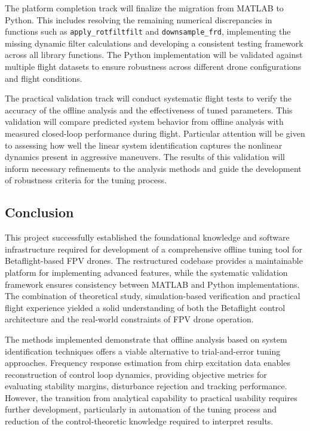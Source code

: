 \documentclass[a4paper,11pt]{scrartcl}
\begin{document}
The platform completion track will finalize the migration from MATLAB to Python. This includes resolving the remaining numerical discrepancies in functions such as \texttt{apply\_rotfiltfilt} and \texttt{downsample\_frd}, implementing the missing dynamic filter calculations and developing a consistent testing framework across all library functions. The Python implementation will be validated against multiple flight datasets to ensure robustness across different drone configurations and flight conditions.

The practical validation track will conduct systematic flight tests to verify the accuracy of the offline analysis and the effectiveness of tuned parameters. This validation will compare predicted system behavior from offline analysis with measured closed-loop performance during flight. Particular attention will be given to assessing how well the linear system identification captures the nonlinear dynamics present in aggressive maneuvers. The results of this validation will inform necessary refinements to the analysis methods and guide the development of robustness criteria for the tuning process.

\clearpage

\subsection{Conclusion}

This project successfully established the foundational knowledge and software infrastructure required for development of a comprehensive offline tuning tool for Betaflight-based FPV drones. The restructured codebase provides a maintainable platform for implementing advanced features, while the systematic validation framework ensures consistency between MATLAB and Python implementations. The combination of theoretical study, simulation-based verification and practical flight experience yielded a solid understanding of both the Betaflight control architecture and the real-world constraints of FPV drone operation.

The methods implemented demonstrate that offline analysis based on system identification techniques offers a viable alternative to trial-and-error tuning approaches. Frequency response estimation from chirp excitation data enables reconstruction of control loop dynamics, providing objective metrics for evaluating stability margins, disturbance rejection and tracking performance. However, the transition from analytical capability to practical usability requires further development, particularly in automation of the tuning process and reduction of the control-theoretic knowledge required to interpret results.
\end{document}
